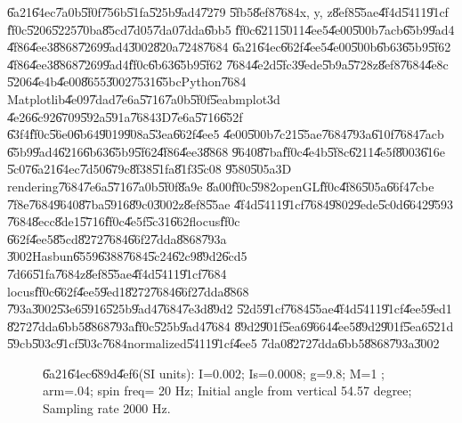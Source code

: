 \documentclass[12pt,a4paper]{article}
\begin{document}
\U{6a21}\U{64ec}\U{7a0b}\U{5f0f}\U{756b}\U{51fa}\U{525b}\U{9ad4}\U{7279}%
\U{5fb5}\U{8ef8}\U{7684}x, y, z\U{8ef8}\U{55ae}\U{4f4d}\U{5411}\U{91cf}%
\U{ff0c}\U{5206}\U{5225}\U{70ba}\U{85cd}\U{7d05}\U{7da0}\U{7dda}\U{6bb5}%
\U{ff0c}\U{6211}\U{5011}\U{4ee5}\U{4e00}\U{500b}\U{7acb}\U{65b9}\U{9ad4}%
\U{4f86}\U{4ee3}\U{8868}\U{7269}\U{9ad4}\U{3002}\U{820a}\U{7248}\U{7684}%
\U{6a21}\U{64ec}\U{662f}\U{4ee5}\U{4e00}\U{500b}\U{6b63}\U{65b9}\U{5f62}%
\U{4f86}\U{4ee3}\U{8868}\U{7269}\U{9ad4}\U{ff0c}\U{6b63}\U{65b9}\U{5f62}%
\U{7684}\U{4e2d}\U{5fc3}\U{9ede}\U{5b9a}\U{5728}z\U{8ef8}\U{7684}\U{4e8c}%
\U{5206}\U{4e4b}\U{4e00}\U{8655}\U{3002}\U{7531}\U{65bc}Python\U{7684}%
Matplotlib\U{4e09}\U{7dad}\U{7e6a}\U{5716}\U{7a0b}\U{5f0f}\U{5eab}mplot3d%
\U{4e26}\U{6c92}\U{6709}\U{592a}\U{591a}\U{7684}3D\U{7e6a}\U{5716}\U{652f}%
\U{63f4}\U{ff0c}\U{56e0}\U{6b64}\U{9019}\U{908a}\U{53ea}\U{662f}\U{4ee5}%
\U{4e00}\U{500b}\U{7c21}\U{55ae}\U{7684}\U{793a}\U{610f}\U{7684}\U{7acb}%
\U{65b9}\U{9ad4}\U{6216}\U{6b63}\U{65b9}\U{5f62}\U{4f86}\U{4ee3}\U{8868}%
\U{9640}\U{87ba}\U{ff0c}\U{4e4b}\U{5f8c}\U{6211}\U{4e5f}\U{8003}\U{616e}%
\U{5c07}\U{6a21}\U{64ec}\U{7d50}\U{679c}\U{8f38}\U{51fa}\U{81f3}\U{5c08}%
\U{9580}\U{505a}3D rendering\U{7684}\U{7e6a}\U{5716}\U{7a0b}\U{5f0f}\U{8a9e}%
\U{8a00}\U{ff0c}\U{5982}openGL\U{ff0c}\U{4f86}\U{505a}\U{66f4}\U{7cbe}%
\U{7f8e}\U{7684}\U{9640}\U{87ba}\U{5916}\U{89c0}\U{3002}z\U{8ef8}\U{55ae}%
\U{4f4d}\U{5411}\U{91cf}\U{7684}\U{9802}\U{9ede}\U{5c0d}\U{6642}\U{9593}%
\U{7684}\U{8ecc}\U{8de1}\U{5716}\U{ff0c}\U{4e5f}\U{5c31}\U{662f}locus\U{ff0c}%
\U{662f}\U{4ee5}\U{85cd}\U{8272}\U{7684}\U{66f2}\U{7dda}\U{8868}\U{793a}%
\U{3002}Hasbun\U{6559}\U{6388}\U{7684}\U{5c24}\U{62c9}\U{89d2}\U{6cd5}%
\U{7d66}\U{51fa}\U{7684}z\U{8ef8}\U{55ae}\U{4f4d}\U{5411}\U{91cf}\U{7684}%
locus\U{ff0c}\U{662f}\U{4ee5}\U{9ed1}\U{8272}\U{7684}\U{66f2}\U{7dda}\U{8868}%
\U{793a}\U{3002}\U{53e6}\U{5916}\U{525b}\U{9ad4}\U{7684}\U{7e3d}\U{89d2}%
\U{52d5}\U{91cf}\U{7684}\U{55ae}\U{4f4d}\U{5411}\U{91cf}\U{4ee5}\U{9ed1}%
\U{8272}\U{7dda}\U{6bb5}\U{8868}\U{793a}\U{ff0c}\U{525b}\U{9ad4}\U{7684}%
\U{89d2}\U{901f}\U{5ea6}\U{9664}\U{4ee5}\U{89d2}\U{901f}\U{5ea6}\U{521d}%
\U{59cb}\U{503c}\U{91cf}\U{503c}\U{7684}normalized\U{5411}\U{91cf}\U{4ee5}%
\U{7da0}\U{8272}\U{7dda}\U{6bb5}\U{8868}\U{793a}\U{3002}

\begin{figure}[th]
\caption{\U{6a21}\U{64ec}\U{689d}\U{4ef6}(SI units): I=0.002; Is=0.0008;
g=9.8; M=1 ; arm=.04; spin freq= 20 Hz; Initial angle from vertical 54.57
degree; Sampling rate 2000 Hz.}
\begin{center}
\fbox{}
\end{center}
\end{figure}
\end{document}
